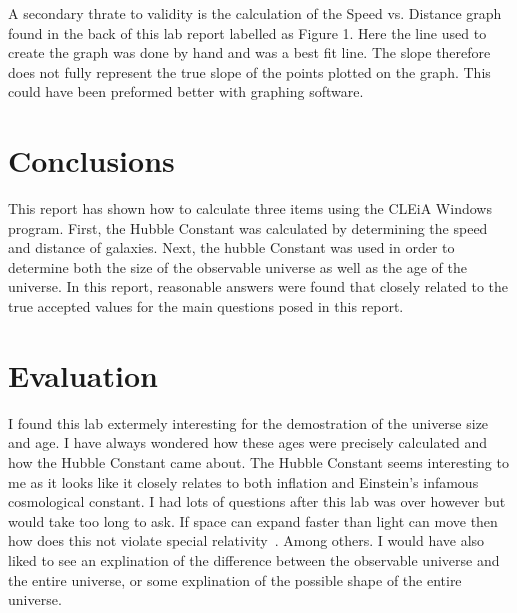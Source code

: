 \documentclass{article}
\begin{document}
A secondary thrate to validity is the calculation of the Speed vs. Distance graph
found in the back of this lab report labelled as Figure 1. Here the line used to create
the graph was done by hand and was a best fit line. The slope therefore does not fully
represent the true slope of the points plotted on the graph. This could have been 
preformed better with graphing software.




\section{Conclusions}

This report has shown how to calculate three items using the CLEiA Windows program.
First, the Hubble Constant was calculated by determining the speed and distance of
galaxies. Next, the hubble Constant was used in order to determine both the size of
the observable universe as well as the age of the universe. In this report, reasonable
answers were found that closely related to the true accepted values for the main
questions posed in this report.


\section{Evaluation}

I found this lab extermely interesting for the demostration of the universe size
and age. I have always wondered how these ages were precisely calculated and how
the Hubble Constant came about. The Hubble Constant seems interesting to me as
it looks like it closely relates to both inflation and Einstein's infamous 
cosmological constant. I had lots of questions after this lab was over however 
but would take too long to ask. If space can expand faster than light can move
then how does this not violate special relativity~\cite{alb:1905}. 
Among others. I would have also
liked to see an explination of the difference between the observable universe
and the entire universe, or some explination of the possible shape of the 
entire universe.
\end{document}
